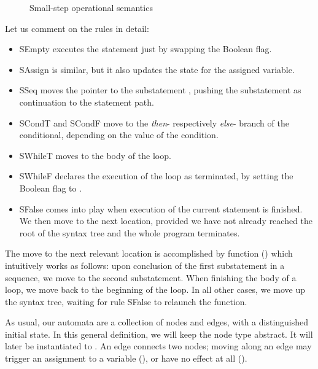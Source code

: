 \begin{isabellebody}
\begin{figure}[h!]
\begin{isamarkuptext}
\begin{center}
\begin{small}
\end{small}
\end{center}\end{isamarkuptext}\isamarkuptrue \figline{}
\caption{Small-step operational semantics}\label{fig:smallStep}
\end{figure}
\begin{isamarkuptext}Let us comment on the rules in detail:
\begin{itemize}
\item {\sc SEmpty} executes the  statement just by swapping the Boolean flag.
\item {\sc SAssign} is similar, but it also updates the state for the assigned variable.
\item {\sc SSeq} moves the pointer to the substatement , 
  pushing the substatement  as continuation to the statement path. 
\item {\sc SCondT} and {\sc SCondF} move to the \emph{then}- respectively \emph{else}- 
  branch of the conditional, depending on the value of the condition. 
\item {\sc SWhileT} moves to the body of the loop.
\item {\sc SWhileF} declares the execution of the loop as terminated, 
  by setting the Boolean flag to .
\item {\sc SFalse} comes into play when execution of the current statement is finished. 
  We then move to the next location, provided we have not already reached the root of 
  the syntax tree and the whole program terminates.
\end{itemize}

The move to the next relevant location is accomplished by function  () which intuitively works as follows: upon conclusion of the first substatement in
a sequence, we move to the second substatement. When finishing the body of a
loop, we move back to the beginning of the loop. In all other cases, we move
up the syntax tree, waiting for rule {\sc SFalse} to relaunch the
function.\end{isamarkuptext}\isamarkuptrue {}
\isamarkuptrue {}
\isamarkuptrue \begin{isamarkuptext}As usual, our automata are a collection of nodes and edges,
with a distinguished initial state. In this general definition, we will keep the node type  abstract. It will later be instantiated to .
An edge connects two nodes; moving along an edge may trigger an assignment to a
variable (), or have no effect at all ().


\end{isamarkuptext}
\end{isabellebody}
